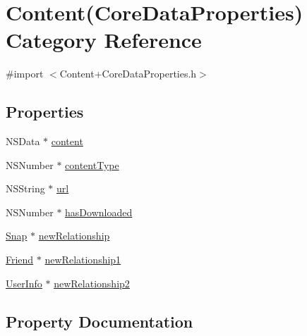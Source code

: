 \hypertarget{category_content_07_core_data_properties_08}{}\section{Content(Core\+Data\+Properties) Category Reference}
\label{category_content_07_core_data_properties_08}


{\ttfamily \#import $<$Content+\+Core\+Data\+Properties.\+h$>$}

\subsection*{Properties}
\begin{DoxyCompactItemize}
\item 
N\+S\+Data $\ast$ \hyperlink{category_content_07_core_data_properties_08_afc95ad6eb444142762764776c7167ce0}{content}
\item 
N\+S\+Number $\ast$ \hyperlink{category_content_07_core_data_properties_08_ab4dabc1aa27718c616787748076ab10b}{content\+Type}
\item 
N\+S\+String $\ast$ \hyperlink{category_content_07_core_data_properties_08_a69ab79cf4ff1fc815c93956fc9108dfd}{url}
\item 
N\+S\+Number $\ast$ \hyperlink{category_content_07_core_data_properties_08_a2889370c08c2aa08de72518277c7a72f}{has\+Downloaded}
\item 
\hyperlink{interface_snap}{Snap} $\ast$ \hyperlink{category_content_07_core_data_properties_08_a9fe9cbddf7a12d3fae374d6a0f20967a}{new\+Relationship}
\item 
\hyperlink{interface_friend}{Friend} $\ast$ \hyperlink{category_content_07_core_data_properties_08_acdbcc4a73539ea8120df429fff076ae4}{new\+Relationship1}
\item 
\hyperlink{interface_user_info}{User\+Info} $\ast$ \hyperlink{category_content_07_core_data_properties_08_a548aaf829a86fcdfdbe44b8c1964340e}{new\+Relationship2}
\end{DoxyCompactItemize}


\subsection{Property Documentation}
\hypertarget{category_content_07_core_data_properties_08_afc95ad6eb444142762764776c7167ce0}{}\label{category_content_07_core_data_properties_08_afc95ad6eb444142762764776c7167ce0} 
